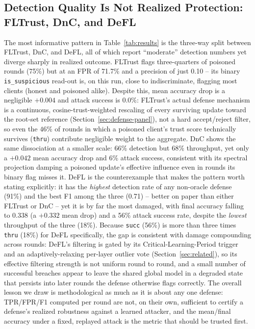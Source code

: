 \documentclass[conference]{IEEEtran}
\begin{document}
\subsection{Detection Quality Is Not Realized Protection: FLTrust, DnC, and DeFL}
The most informative pattern in Table~\ref{tab:results} is the three-way split between FLTrust, DnC, and DeFL, all of which report ``moderate'' detection numbers yet diverge sharply in realized outcome. FLTrust flags three-quarters of poisoned rounds (75\%) but at an FPR of 71.7\% and a precision of just 0.10 -- its binary \texttt{is\_suspicious} read-out is, on this run, close to indiscriminate, flagging most clients (honest and poisoned alike). Despite this, mean accuracy drop is a negligible $+0.004$ and attack success is $0.0\%$: FLTrust's actual defense mechanism is a continuous, cosine-trust-weighted rescaling of every surviving update toward the root-set reference (Section~\ref{sec:defense-panel}), not a hard accept/reject filter, so even the $46\%$ of rounds in which a poisoned client's trust score technically survives (\texttt{thru}) contribute negligible weight to the aggregate. DnC shows the same dissociation at a smaller scale: 66\% detection but 68\% throughput, yet only a $+0.042$ mean accuracy drop and 6\% attack success, consistent with its spectral projection damping a poisoned update's effective influence even in rounds its binary flag misses it. DeFL is the counterexample that makes the pattern worth stating explicitly: it has the \emph{highest} detection rate of any non-oracle defense (91\%) and the best F1 among the three (0.71) -- better on paper than either FLTrust or DnC -- yet it is by far the most damaged, with final accuracy falling to 0.338 (a $+0.332$ mean drop) and a 56\% attack success rate, despite the \emph{lowest} throughput of the three (18\%). Because \texttt{succ} (56\%) is more than three times \texttt{thru} (18\%) for DeFL specifically, the gap is consistent with damage compounding across rounds: DeFL's filtering is gated by its Critical-Learning-Period trigger and an adaptively-relaxing per-layer outlier vote (Section~\ref{sec:related}), so its effective filtering strength is not uniform round to round, and a small number of successful breaches appear to leave the shared global model in a degraded state that persists into later rounds the defense otherwise flags correctly. The overall lesson we draw is methodological as much as it is about any one defense: TPR/FPR/F1 computed per round are not, on their own, sufficient to certify a defense's realized robustness against a learned attacker, and the mean/final accuracy under a fixed, replayed attack is the metric that should be trusted first.
\end{document}
